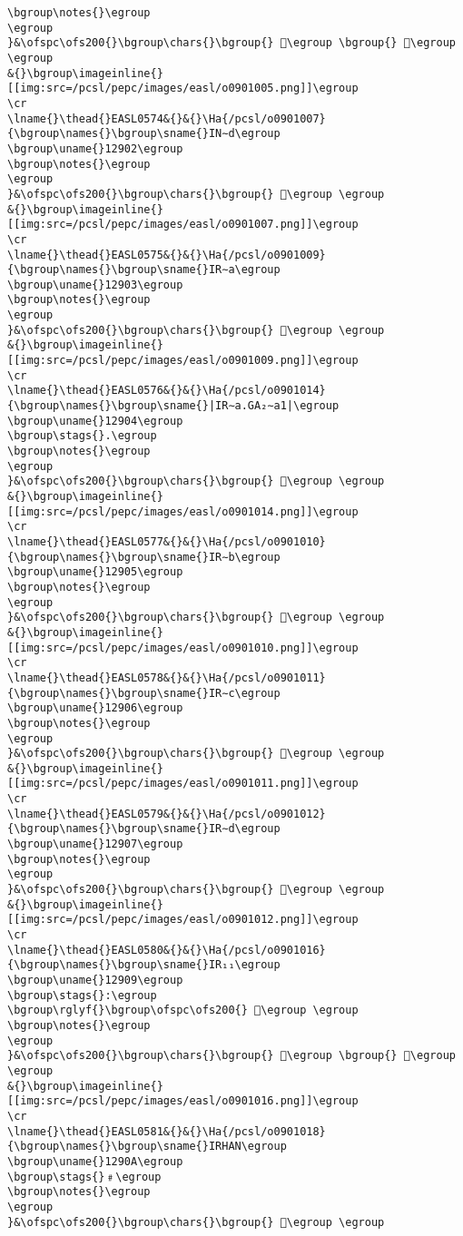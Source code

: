 \begin{verbatim}
\bgroup\notes{}\egroup
\egroup
}&\ofspc\ofs200{}\bgroup\chars{}\bgroup{} 𒤀\egroup \bgroup{} 𒤁\egroup \egroup
&{}\bgroup\imageinline{}[[img:src=/pcsl/pepc/images/easl/o0901005.png]]\egroup
\cr
\lname{}\thead{}EASL0574&{}&{}\Ha{/pcsl/o0901007}{\bgroup\names{}\bgroup\sname{}IN∼d\egroup
\bgroup\uname{}12902\egroup
\bgroup\notes{}\egroup
\egroup
}&\ofspc\ofs200{}\bgroup\chars{}\bgroup{} 𒤂\egroup \egroup
&{}\bgroup\imageinline{}[[img:src=/pcsl/pepc/images/easl/o0901007.png]]\egroup
\cr
\lname{}\thead{}EASL0575&{}&{}\Ha{/pcsl/o0901009}{\bgroup\names{}\bgroup\sname{}IR∼a\egroup
\bgroup\uname{}12903\egroup
\bgroup\notes{}\egroup
\egroup
}&\ofspc\ofs200{}\bgroup\chars{}\bgroup{} 𒤃\egroup \egroup
&{}\bgroup\imageinline{}[[img:src=/pcsl/pepc/images/easl/o0901009.png]]\egroup
\cr
\lname{}\thead{}EASL0576&{}&{}\Ha{/pcsl/o0901014}{\bgroup\names{}\bgroup\sname{}|IR∼a.GA₂∼a1|\egroup
\bgroup\uname{}12904\egroup
\bgroup\stags{}.\egroup
\bgroup\notes{}\egroup
\egroup
}&\ofspc\ofs200{}\bgroup\chars{}\bgroup{} 𒤄\egroup \egroup
&{}\bgroup\imageinline{}[[img:src=/pcsl/pepc/images/easl/o0901014.png]]\egroup
\cr
\lname{}\thead{}EASL0577&{}&{}\Ha{/pcsl/o0901010}{\bgroup\names{}\bgroup\sname{}IR∼b\egroup
\bgroup\uname{}12905\egroup
\bgroup\notes{}\egroup
\egroup
}&\ofspc\ofs200{}\bgroup\chars{}\bgroup{} 𒤅\egroup \egroup
&{}\bgroup\imageinline{}[[img:src=/pcsl/pepc/images/easl/o0901010.png]]\egroup
\cr
\lname{}\thead{}EASL0578&{}&{}\Ha{/pcsl/o0901011}{\bgroup\names{}\bgroup\sname{}IR∼c\egroup
\bgroup\uname{}12906\egroup
\bgroup\notes{}\egroup
\egroup
}&\ofspc\ofs200{}\bgroup\chars{}\bgroup{} 𒤆\egroup \egroup
&{}\bgroup\imageinline{}[[img:src=/pcsl/pepc/images/easl/o0901011.png]]\egroup
\cr
\lname{}\thead{}EASL0579&{}&{}\Ha{/pcsl/o0901012}{\bgroup\names{}\bgroup\sname{}IR∼d\egroup
\bgroup\uname{}12907\egroup
\bgroup\notes{}\egroup
\egroup
}&\ofspc\ofs200{}\bgroup\chars{}\bgroup{} 𒤇\egroup \egroup
&{}\bgroup\imageinline{}[[img:src=/pcsl/pepc/images/easl/o0901012.png]]\egroup
\cr
\lname{}\thead{}EASL0580&{}&{}\Ha{/pcsl/o0901016}{\bgroup\names{}\bgroup\sname{}IR₁₁\egroup
\bgroup\uname{}12909\egroup
\bgroup\stags{}:\egroup
\bgroup\rglyf{}\bgroup\ofspc\ofs200{} 𒤉\egroup \egroup
\bgroup\notes{}\egroup
\egroup
}&\ofspc\ofs200{}\bgroup\chars{}\bgroup{} 𒤈\egroup \bgroup{} 𒤉\egroup \egroup
&{}\bgroup\imageinline{}[[img:src=/pcsl/pepc/images/easl/o0901016.png]]\egroup
\cr
\lname{}\thead{}EASL0581&{}&{}\Ha{/pcsl/o0901018}{\bgroup\names{}\bgroup\sname{}IRHAN\egroup
\bgroup\uname{}1290A\egroup
\bgroup\stags{}﹟\egroup
\bgroup\notes{}\egroup
\egroup
}&\ofspc\ofs200{}\bgroup\chars{}\bgroup{} 𒤊\egroup \egroup

\end{verbatim}
